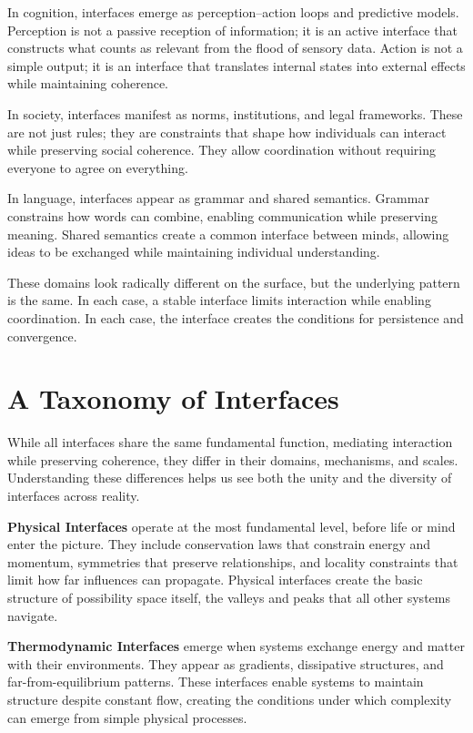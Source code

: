 \documentclass[
  openright]{book}
\begin{document}
In cognition, interfaces emerge as perception--action loops and
predictive models. Perception is not a passive reception of information;
it is an active interface that constructs what counts as relevant from
the flood of sensory data. Action is not a simple output; it is an
interface that translates internal states into external effects while
maintaining coherence.

In society, interfaces manifest as norms, institutions, and legal
frameworks. These are not just rules; they are constraints that shape
how individuals can interact while preserving social coherence. They
allow coordination without requiring everyone to agree on everything.

In language, interfaces appear as grammar and shared semantics. Grammar
constrains how words can combine, enabling communication while
preserving meaning. Shared semantics create a common interface between
minds, allowing ideas to be exchanged while maintaining individual
understanding.

These domains look radically different on the surface, but the
underlying pattern is the same. In each case, a stable interface limits
interaction while enabling coordination. In each case, the interface
creates the conditions for persistence and convergence.

\section{A Taxonomy of Interfaces}\label{a-taxonomy-of-interfaces}

While all interfaces share the same fundamental function, mediating
interaction while preserving coherence, they differ in their domains,
mechanisms, and scales. Understanding these differences helps us see
both the unity and the diversity of interfaces across reality.

\textbf{Physical Interfaces} operate at the
most fundamental level, before life or mind enter the picture. They
include conservation laws that constrain energy and momentum, symmetries
that preserve relationships, and locality constraints that limit how far
influences can propagate. Physical interfaces create the basic structure
of possibility space itself, the valleys and peaks that all other
systems navigate.

\textbf{Thermodynamic Interfaces} emerge
when systems exchange energy and matter with their environments. They
appear as gradients, dissipative structures, and far-from-equilibrium
patterns. These interfaces enable systems to maintain structure despite
constant flow, creating the conditions under which complexity can emerge
from simple physical processes.
\end{document}
